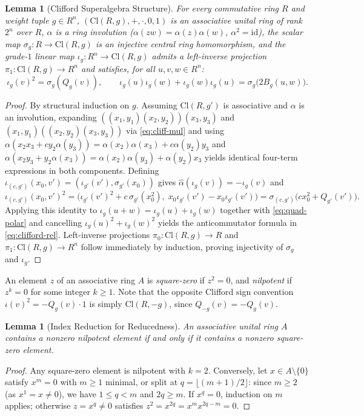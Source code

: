 \documentclass[11pt]{article}
\newtheorem{lemma}[theorem]{Lemma}
\theoremstyle{definition}
\newcommand{\Cl}{\mathrm{Cl}}
\begin{document}
\begin{lemma}[Clifford Superalgebra Structure]\label{lem:clifford}
For every commutative ring $R$ and weight tuple $g \in R^n$, $(\Cl(R, g), +, \cdot, 0, 1)$
is an associative unital ring of rank $2^n$ over $R$, $\alpha$ is a ring involution
($\alpha(z w) = \alpha(z)\alpha(w)$, $\alpha^2 = \mathrm{id}$), the scalar map
$\sigma_g : R \to \Cl(R, g)$ is an injective central ring homomorphism, and the grade-$1$
linear map $\iota_g : R^n \to \Cl(R, g)$ admits a left-inverse projection $\pi_1 : \Cl(R, g) \to R^n$
and satisfies, for all $u, v, w \in R^n$:
\begin{equation}\label{eq:clifford-rel}
  \iota_g(v)^2 = \sigma_g(Q_g(v)), \qquad
  \iota_g(u)\iota_g(w) + \iota_g(w)\iota_g(u) = \sigma_g\bigl(2 B_g(u, w)\bigr).
\end{equation}
\end{lemma}
\begin{proof}
By structural induction on $g$. Assuming $\Cl(R, g')$ is associative and $\alpha$ is an
involution, expanding $((x_1, y_1)(x_2, y_2))(x_3, y_3)$ and $(x_1, y_1)((x_2, y_2)(x_3, y_3))$
via \eqref{eq:cliff-mul} and using $\alpha(x_2 x_3 + c y_2 \alpha(y_3)) =
\alpha(x_2)\alpha(x_3) + c \alpha(y_2) y_3$ and $\alpha(x_2 y_3 + y_2 \alpha(x_3)) =
\alpha(x_2)\alpha(y_3) + \alpha(y_2) x_3$ yields identical four-term expressions in both
components. Defining $\iota_{(c, g')}(x_0, v') = (\iota_{g'}(v'), \sigma_{g'}(x_0))$ gives
$\hat{\alpha}(\iota_g(v)) = -\iota_g(v)$ and
\[
  \iota_{(c,g')}(x_0, v')^2
  = \bigl(\iota_{g'}(v')^2 + c\,\sigma_{g'}(x_0^2),\;
    x_0 \iota_{g'}(v') - x_0 \iota_{g'}(v')\bigr)
  = \sigma_{(c,g')}\bigl(c x_0^2 + Q_{g'}(v')\bigr).
\]
Applying this identity to $\iota_g(u + w) = \iota_g(u) + \iota_g(w)$ together with
\eqref{eq:quad-polar} and cancelling $\iota_g(u)^2 + \iota_g(w)^2$ yields the
anticommutator formula in \eqref{eq:clifford-rel}. Left-inverse projections
$\pi_0 : \Cl(R, g) \to R$ and $\pi_1 : \Cl(R, g) \to R^n$ follow immediately by
induction, proving injectivity of $\sigma_g$ and $\iota_g$.
\end{proof}

An element $z$ of an associative ring $A$ is \emph{square-zero} if $z^2 = 0$, and
\emph{nilpotent} if $z^k = 0$ for some integer $k \ge 1$. Note that the opposite Clifford
sign convention $\iota(v)^2 = -Q_g(v)\cdot 1$ is simply $\Cl(R, -g)$, since
$Q_{-g}(v) = -Q_g(v)$.

\begin{lemma}[Index Reduction for Reducedness]\label{lem:nil-red}
An associative unital ring $A$ contains a nonzero nilpotent element if and only if it
contains a nonzero square-zero element.
\end{lemma}
\begin{proof}
Any square-zero element is nilpotent with $k = 2$. Conversely, let $x \in A \setminus \{0\}$
satisfy $x^m = 0$ with $m \ge 1$ minimal, or split at $q = \lfloor (m+1)/2 \rfloor$: since
$m \ge 2$ (as $x^1 = x \ne 0$), we have $1 \le q < m$ and $2q \ge m$. If $x^q = 0$,
induction on $m$ applies; otherwise $z = x^q \ne 0$ satisfies $z^2 = x^{2q} = x^m x^{2q-m} = 0$.
\end{proof}
\end{document}
